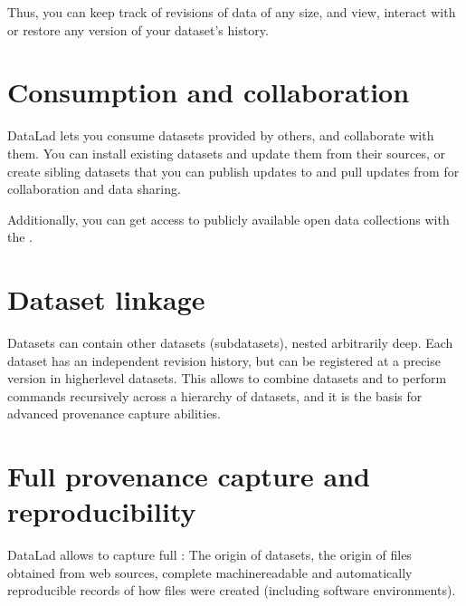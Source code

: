 \begin{figure}[tbp]
\centering

\noindent{}
\end{figure}

\sphinxAtStartPar
Thus, you can keep track of revisions of data of any size, and view, interact with or
restore any version of your dataset’s history.


\section{Consumption and collaboration}
\label{\detokenize{intro/executive_summary:consumption-and-collaboration}}
\sphinxAtStartPar
DataLad lets you consume datasets provided by others, and collaborate with them.
You can install existing datasets and update them from their sources, or create
sibling datasets that you can publish updates to and pull updates from for
collaboration and data sharing.

\begin{figure}[tbp]
\centering

\noindent{}
\end{figure}

\sphinxAtStartPar
Additionally, you can get access to publicly available open
data collections with the {\hyperref[\detokenize{glossary:term-the-DataLad-superdataset}]{}}.


\section{Dataset linkage}
\label{\detokenize{intro/executive_summary:dataset-linkage}}
\sphinxAtStartPar
Datasets can contain other datasets (subdatasets), nested arbitrarily deep. Each
dataset has an independent revision history, but can be registered at a precise version
in higher\sphinxhyphen{}level datasets. This allows to combine datasets and to perform commands recursively across
a hierarchy of datasets, and it is the basis for advanced provenance capture abilities.

\begin{figure}[tbp]
\centering

\noindent{}
\end{figure}


\section{Full provenance capture and reproducibility}
\label{\detokenize{intro/executive_summary:full-provenance-capture-and-reproducibility}}
\sphinxAtStartPar
DataLad allows to capture full {\hyperref[\detokenize{glossary:term-provenance}]{}}: The origin of datasets, the
origin of files obtained from web sources, complete machine\sphinxhyphen{}readable and
automatically reproducible records of how files were created (including software
environments).

